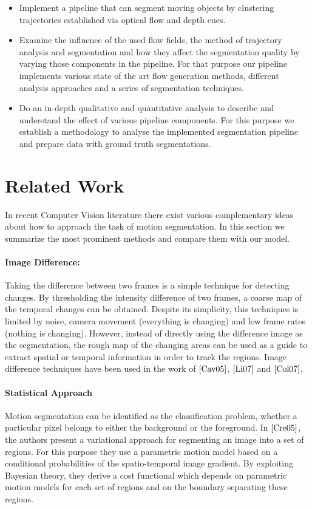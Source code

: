 \begin{itemize}
  \item Implement a pipeline that can segment moving objects by clustering trajectories established via optical flow and depth cues.
  \item Examine the influence of the used flow fields, the method of trajectory analysis and segmentation and how they affect the segmentation quality by varying those components in the pipeline. For that purpose our pipeline implements various state of the art flow generation methods, different analysis approaches and a series of segmentation techniques.
  \item Do an in-depth qualitative and quantitative analysis to describe and understand the effect of various pipeline components. For this purpose we establish a methodology to analyse the implemented segmentation pipeline and prepare data with ground truth segmentations. 
\end{itemize}

\section{Related Work}
In recent Computer Vision literature there exist various complementary ideas about how to approach the task of motion segmentation. In this section we summarize the most prominent methods and compare them with our model.

\paragraph{Image Difference:} Taking the difference between two frames is a simple technique for detecting changes. By thresholding the intensity difference of two frames, a coarse map of the temporal changes can be obtained. Despite its simplicity, this techniques is limited by noise, camera movement (everything is changing) and low frame rates (nothing is changing). However, instead of directly using the difference image as the segmentation, the rough map of the changing areas can be used as a guide to extract spatial or temporal information in order to track the regions. Image difference techniques have been used in the work of $\cite{Cav05}$, $\cite{Li07}$ and $\cite{Col07}$.

\paragraph{Statistical Approach} Motion segmentation can be identified as the classification problem, whether a particular pixel belongs to either the background or the foreground. In $\cite{Cre05}$, the authors present a variational approach for segmenting an image into a set of regions. For this purpose they use a parametric motion model based on a conditional probabilities of the spatio-temporal image gradient. By exploiting Bayesian theory, they derive a cost functional which depends on parametric motion models for each set of regions and on the boundary separating these regions.


